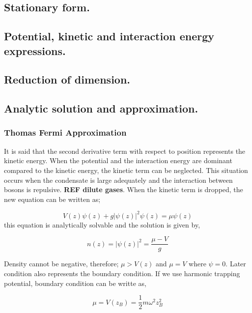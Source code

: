 \documentclass[a4paper,times,12pt]{article}
\begin{document}
\subsection{Stationary form.}
\subsection{Potential, kinetic and interaction energy expressions.}
\subsection{Reduction of dimension.}
\subsection{Analytic solution and approximation.}

\subsubsection{Thomas Fermi Approximation}



It is said that the second derivative term with respect to position represents the kinetic energy. When the potential and the interaction energy are dominant compared to the kinetic energy, the kinetic term can be neglected. This situation occurs when the condensate is large adequately and the interaction between bosons is repulsive. \textbf{REF dilute gases}. When the kinetic term is dropped, the new equation can be written as;

\begin{equation}
\label{eq:GPE_1D_thomas_fermi}
    V(z)\psi(z) + g|\psi(z)|^2\psi(z) = \mu\psi(z)
\end{equation}
this equation is analytically solvable and the solution is given by,

\begin{equation}
\label{eq:thomas_fermi_solution}
    n(z) = |\psi(z)|^2 = \frac{\mu - V}{g}
\end{equation}

Density cannot be negative, therefore; $ \mu > V(z) $ and $ \mu = V$ where $\psi = 0$. Later condition also represents the boundary condition. If we use harmonic trapping potential, boundary condition can be writte as,

\begin{equation}
    \mu = V(z_B) = \frac{1}{2}m\omega^2z_B^2    
\end{equation}
\end{document}
